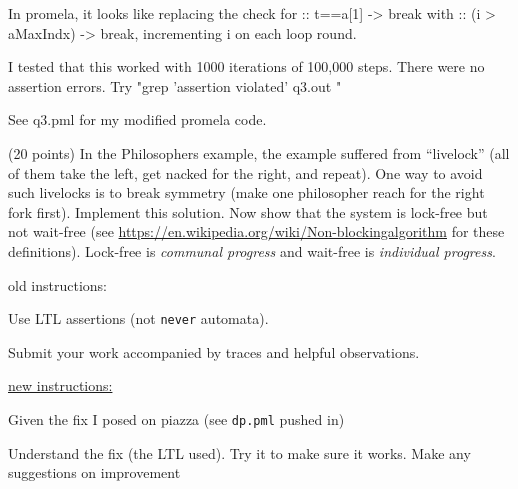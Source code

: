 \documentclass[11pt]{article}
\begin{document}
\begin{enumerate}
\begin{minipage}{\minpagw}
{{      In promela, it looks like replacing the check for :: t==a[1] -> break with :: (i > aMaxIndx) -> break, incrementing i on each loop round.
      
      I tested that this worked with 1000 iterations of 100,000 steps. There were no assertion errors. Try "grep 'assertion violated' q3.out "
      
      See q3.pml for my modified promela code.
    }%
  }%
\end{minipage}

\clearpage

\item (20 points) In the Philosophers example, the example suffered
  from
  ``livelock'' (all of them take the left, get nacked for the right,
  and repeat).
  One way to avoid such livelocks is to break symmetry (make one philosopher
  reach for the right fork first).
  Implement this solution.
  Now show that the system is lock-free but not wait-free
  (see \url{https://en.wikipedia.org/wiki/Non-blockingalgorithm}
  for these definitions).
  Lock-free is {\em communal progress}
  and
  wait-free is {\em individual progress}.
  \begin{compactitem}
  \item old instructions:
    \begin{scriptsize}
      \begin{compactitem}
      \item  Use LTL assertions (not {\tt never} automata).

      \item  Submit your work accompanied by traces and helpful observations.
      \end{compactitem}
     
  \end{scriptsize}

\item \underline{new instructions:}
  \begin{compactitem}
  \item Given the fix I posed on piazza (see {\tt dp\contrarian.pml} pushed in)
  \item Understand the fix (the LTL used). Try it to make sure it works. Make any suggestions on improvement
  \end{compactitem}
  \end{compactitem}
  
\begin{minipage}{\minpagw}
\end{minipage}
\end{enumerate}
\end{document}

